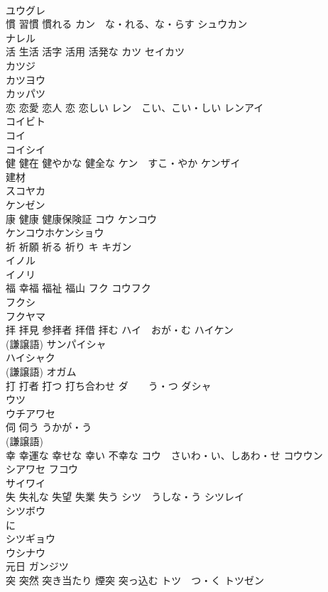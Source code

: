 \documentclass[8pt]{extreport}
\begin{document}
\begin{CJK}{UTF8}{min}
\\	ユウグレ
\\	慣 習慣 慣れる	カン　な・れる、な・らす シュウカン 
\\	ナレル 
\\	活 生活 活字 活用 活発な	カツ セイカツ
\\	カツジ
\\	カツヨウ
\\	カッパツ 
\\	恋 恋愛 恋人 恋 恋しい	レン　こい、こい・しい レンアイ
\\	コイビト
\\	コイ 
\\	コイシイ 
\\	健 健在 健やかな 健全な	ケン　すこ・やか ケンザイ 
\\	建材 
\\	スコヤカ 
\\	ケンゼン
\\	康 健康 健康保険証	コウ ケンコウ
\\	ケンコウホケンショウ 
\\	祈 祈願 祈る 祈り	キ キガン 
\\	イノル 
\\	イノリ 
\\	福 幸福 福祉 福山	フク コウフク 
\\	フクシ 
\\	フクヤマ 
\\	拝 拝見 参拝者 拝借 拝む	ハイ　おが・む ハイケン 
\\	(謙譲語) サンパイシャ 
\\	ハイシャク 
\\	(謙譲語) オガム 
\\	打 打者 打つ 打ち合わせ	ダ　　う・つ ダシャ 
\\	ウツ 
\\	ウチアワセ 
\\	伺 伺う	うかが・う 
\\	(謙譲語)
\\	幸 幸運な 幸せな 幸い 不幸な	コウ　さいわ・い、しあわ・せ コウウン 
\\	シアワセ フコウ 
\\	サイワイ 
\\	失 失礼な 失望 失業 失う	シツ　うしな・う シツレイ 
\\	シツボウ 
\\	に 
\\	シツギョウ 
\\	ウシナウ 
\\	元日	ガンジツ 
\\	突 突然 突き当たり 煙突 突っ込む	トツ　つ・く トツゼン 

\end{CJK}
\end{document}
